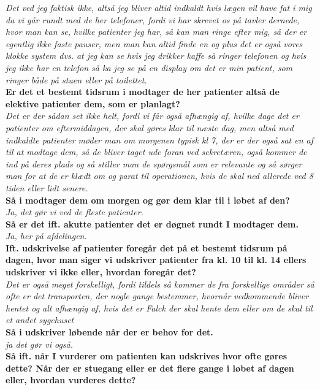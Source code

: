 \noindent
\textit{Det ved jeg faktisk ikke, altså jeg bliver altid indkaldt hvis lægen vil have fat i mig da vi går rundt med de her telefoner, fordi vi har skrevet os på tavler dernede, hvor man kan se, hvilke patienter jeg har, så kan man ringe efter mig, så der er egentlig ikke faste pauser, men man kan altid finde en og plus det er også vores klokke system dvs. at jeg kan se hvis jeg drikker kaffe så ringer telefonen og hvis jeg ikke har en telefon så ka jeg se på en display om det er min patient, som ringer både på stuen eller på toilettet.}  \\
\noindent
\textbf{Er det et bestemt tidsrum i modtager de her patienter altså de elektive patienter dem, som er planlagt?}\\
\noindent
\textit{Det er der sådan set ikke helt, fordi vi får også afhængig af, hvilke dage det er patienter om eftermiddagen, der skal gøres klar til næste dag, men altså med indkaldte patienter møder man om morgenen typisk kl 7, der er der også sat en af til at modtage dem, så de bliver taget ude foran ved sekretæren, også kommer de ind på deres plads og så stiller man de spørgsmål som er relevante og så sørger man for at de er klædt om og parat til operationen, hvis de skal ned allerede ved 8 tiden eller lidt senere.}\\
\noindent
\textbf{Så i modtager dem om morgen og gør dem klar til i løbet af den?}\\
\noindent
\textit{Ja, det gør vi ved de fleste patienter.}\\
\noindent
\textbf{Så er det ift. akutte patienter det er døgnet rundt I modtager dem.}\\
\noindent
\textit{Ja, her på afdelingen. }\\
\noindent
\textbf{Ift. udskrivelse af patienter foregår det på et bestemt tidsrum på dagen, hvor man siger vi udskriver patienter fra kl. 10 til kl. 14 ellers udskriver vi ikke eller, hvordan foregår det?}\\
\noindent
\textit{Det er også meget forskelligt, fordi tildels så kommer de fra forskellige områder så ofte er det transporten, der nogle gange bestemmer, hvornår vedkommende bliver hentet og alt afhængig af, hvis det er Falck der skal hente dem eller om de skal til et andet sygehuset }\\
\noindent
\textbf{Så i udskriver løbende når der er behov for det.}\\
\noindent
\textit{ja det gør vi også.}\\
\noindent
\textbf{Så ift. når I vurderer om patienten kan udskrives hvor ofte gøres dette? Når der er stuegang eller er det flere gange i løbet af dagen eller, hvordan vurderes dette?}\\
